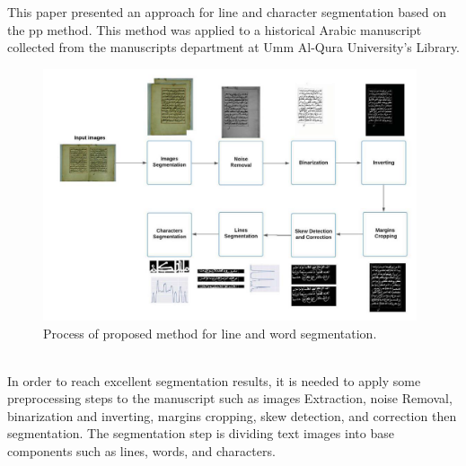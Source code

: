 \noindent
This paper \cite{PP} presented an approach for line and character segmentation based on the \acrshort{pp} method. This method was applied to a historical Arabic manuscript collected from the manuscripts department at Umm Al-Qura University’s Library.
 \begin{figure}[!htb]
    \centering
    \includegraphics[width=11cm]{images/pp_seg.png}
    \caption{Process of proposed method for line and word segmentation.}
    \label{fig:pp_seg}
\end{figure}
\newline\\
In order to reach excellent segmentation results, it is needed to apply some preprocessing steps to the manuscript such as images Extraction, noise Removal, binarization and inverting, margins cropping, skew detection, and correction then segmentation. The segmentation step is dividing text images into base components such as lines, words, and characters.

